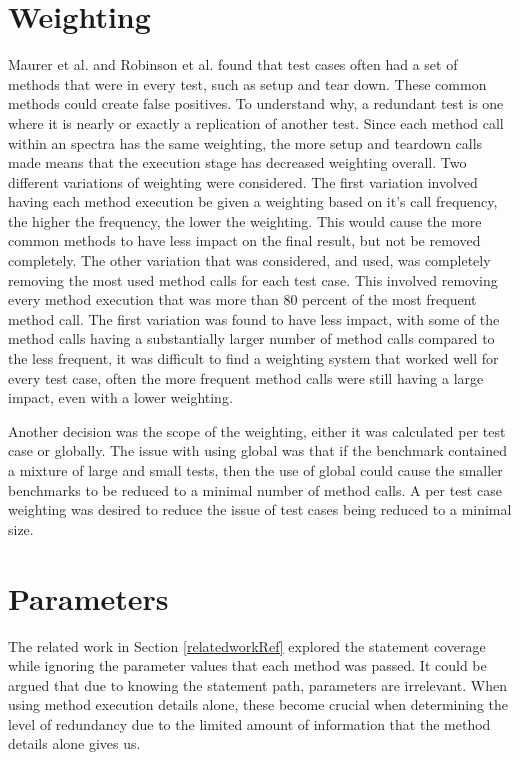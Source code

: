 \section{Weighting}
Maurer et al. \cite{koochakzadeh2009test} and Robinson et al. \cite{li2008static} found that test cases often had a set of methods that were in every test, such as setup and tear down. These common methods could create false positives. To understand why, a redundant test is one where it is nearly or exactly a replication of another test. Since each method call within an spectra has the same weighting, the more setup and teardown calls made means that the execution stage has decreased weighting overall. Two different variations of weighting were considered. The first variation involved having each method execution be given a weighting based on it's call frequency, the higher the frequency, the lower the weighting. This would cause the more common methods to have less impact on the final result, but not be removed completely. The other variation that was considered, and used, was completely removing the most used method calls for each test case. This involved removing every method execution that was more than 80 percent of the most frequent method call. The first variation was found to have less impact, with some of the method calls having a substantially larger number of method calls compared to the less frequent, it was difficult to find a weighting system that worked well for every test case, often the more frequent method calls were still having a large impact, even with a lower weighting.

Another decision was the scope of the weighting, either it was calculated per test case or globally. The issue with using global was that if the benchmark contained a mixture of large and small tests, then the use of global could cause the smaller benchmarks to be reduced to a minimal number of method calls. A per test case weighting was desired to reduce the issue of test cases being reduced to a minimal size.

\section{Parameters}
The related work in Section \ref{relatedworkRef} explored the statement coverage while ignoring the parameter values that each method was passed. It could be argued that due to knowing the statement path, parameters are irrelevant. When using method execution details alone, these become crucial when determining the level of redundancy due to the limited amount of information that the method details alone gives us. 

